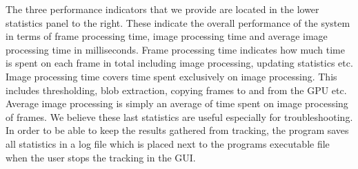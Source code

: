 The three performance indicators that we provide are located in the lower statistics panel to the right. These indicate the overall performance of the system in terms of frame processing time, image processing time and average image processing time in milliseconds. Frame processing time indicates how much time is spent on each frame in total including image processing, updating statistics etc. Image processing time covers time spent exclusively on image processing. This includes thresholding, blob extraction, copying frames to and from the GPU etc. Average image processing is simply an average of time spent on image processing of frames. We believe these last statistics are useful especially for troubleshooting. \\

In order to be able to keep the results gathered from tracking, the program saves all statistics in a log file which is placed next to the programs executable file when the user stops the tracking in the GUI.

